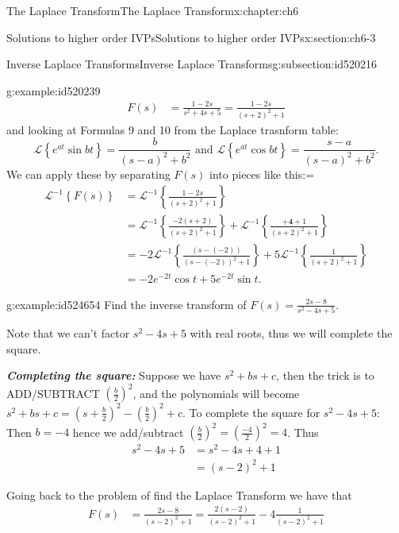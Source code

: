 \documentclass[oneside,10pt,]{book}
\newcommand{\alert}[1]{\textbf{\textit{#1}}}
\numberwithin{equation}{section}
\numberwithin{equation}{section}
\newcommand{\amp}{&}
\begin{document}
\begin{chapterptx}{The Laplace Transform}{}{The Laplace Transform}{}{}{x:chapter:ch6}
\begin{sectionptx}{Solutions to higher order IVPs}{}{Solutions to higher order IVPs}{}{}{x:section:ch6-3}
\begin{subsectionptx}{Inverse Laplace Transforms}{}{Inverse Laplace Transforms}{}{}{g:subsection:id520216}
\begin{example}{}{g:example:id520239}
\begin{align*}
F(s) \amp =\frac{1-2s}{s^{2}+4s+5}=\frac{1-2s}{\left(s+2\right)^{2}+1}
\end{align*}
and looking at Formulas 9 and 10 from the Laplace trasnform table:%
\begin{equation*}
\mathcal{L}\left\{ e^{at}\sin bt\right\} =\frac{b}{(s-a)^{2}+b^{2}}\text{ and }\mathcal{L}\left\{ e^{at}\cos bt\right\} =\frac{s-a}{(s-a)^{2}+b^{2}}.
\end{equation*}
We can apply these by separating \(F(s)\) into pieces like this:=%
\begin{align*}
\mathcal{L}^{-1}\left\{ F(s)\right\}  \amp =\mathcal{L}^{-1}\left\{ \frac{1-2s}{\left(s+2\right)^{2}+1}\right\} \\
\amp =\mathcal{L}^{-1}\left\{ \frac{-2\left(s+2\right)}{\left(s+2\right)^{2}+1}\right\} +\mathcal{L}^{-1}\left\{ \frac{\boldsymbol{+4}+1}{\left(s+2\right)^{2}+1}\right\} \\
\amp =-2\mathcal{L}^{-1}\left\{ \frac{\left(s-\left(-2\right)\right)}{\left(s-\left(-2\right)\right)^{2}+1}\right\} +5\mathcal{L}^{-1}\left\{ \frac{1}{\left(s+2\right)^{2}+1}\right\} \\
\amp =-2e^{-2t}\cos t+5e^{-2t}\sin t.
\end{align*}
%
\end{example}
\begin{example}{}{g:example:id524654}%
Find the inverse transform of \(F(s)=\frac{2s-8}{s^{2}-4s+5}\).%
\par
Note that we can't factor \(s^{2}-4s+5\) with real roots, thus we will complete the square.%
\par
\alert{Completing the square:} Suppose we have \(s^{2}+bs+c\), then the trick is to ADD\slash{}SUBTRACT \(\left(\frac{b}{2}\right)^{2}\), and the polynomials will become \(s^{2}+bs+c=\left(s+\frac{b}{2}\right)^{2}-\left(\frac{b}{2}\right)^{2}+c\). To complete the square for \(s^{2}-4s+5\): Then \(b=-4\) hence we add\slash{}subtract \(\left(\frac{b}{2}\right)^{2}=\left(\frac{-4}{2}\right)^{2}=4\). Thus%
\begin{align*}
s^{2}-4s+5 \amp =s^{2}-4s+4+1\\
\amp =\left(s-2\right)^{2}+1
\end{align*}
%
\par
Going back to the problem of find the Laplace Transform we have that%
\begin{align*}
F(s) \amp =\frac{2s-8}{\left(s-2\right)^{2}+1}=\frac{2\left(s-2\right)}{\left(s-2\right)^{2}+1}-4\frac{1}{\left(s-2\right)^{2}+1}
\end{align*}

\end{example}
\end{subsectionptx}
\end{sectionptx}
\end{chapterptx}
\end{document}
